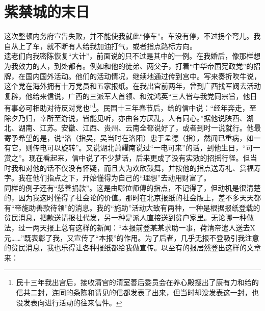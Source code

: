 \fancyhead[RO]{} %
\fancyhead[LE]{} %
\chapter*{紫禁城的末日}
\thispagestyle{empty}
这次整顿内务府宣告失败，并不能使我就此“停车”。车没有停，不过拐个弯儿。我自从上了车，就不断有人给我加油打气，或者指点路标方向。\\

遗老们向我密陈恢复“大计”，前面说的只不过是其中的一例。在我婚后，像那样想为我效力的人，到处都有。例如和他的徒弟、两父子，打着“中华帝国宪政党”的招牌，在国内国外活动。他们的活动情况，继续地通过传到宫中。写来奏折吹牛说，这个党在海外拥有十万党员和五家报纸。在我出宫前两年，曾到广西找军阀去活动复辟，他给来信说，广西的三派军人首领、和沈鸿英“三人皆与我党同宗旨，他日有事必可相助对待反对党也”\footnote{民十三年我出宫后，接收清宫的清室善后委员会在养心殿搜出了康有力和给的信共二封，连同的条陈和请见的信都发表了出来，但当时却没发表这一封，也没发表向进行活动的往来信件。}。民国十三年春节后，给的信中说：“经年奔走，至除夕乃归，幸所至游说，皆能见听，亦由各方厌乱，人有同心。”据他说陕西、湖北、湖南、江苏。安徽、江西、贵州、云南全都说好了，或者到时一说就行。他最寄予希望的是，说“洛（指吴，吴当时在洛阳）忠于孟德（指），然闻已重病，如一有它，则传电可以旋转”。又说湖北萧耀南说过“一电可来”的话，到他生日，“可一赏之”。现在看起来，信中说了不少梦话，后来更成了没有实效的招摇行径。但当时我和对他的话不仅没有怀疑，而且大为欢欣鼓舞，并按他的指点送寿礼、赏福寿字。我在他们指点之下，开始懂得为自己的“理想”去动用财富了。\\

同样的例子还有“慈善捐款”。这是由哪位师傅的指点，不记得了，但动机是很清楚的，因为我这时懂得了社会论的价值。那时在北京报纸的社会版上，差不多天天都有“帝施助善款待领”的消息。我的“施助”活动大致有两种，一种是根据报纸登载的贫民消息，把款送请报社代发，另一种是派人直接送到贫户家里。无论哪一种做法，过一两天报上总有这样的新闻：“本报前登某某求助一事，荷清帝遣人送去X元……”既表彰了我，又宣传了“本报”的作用。为了后者，几乎无报不登吸引我注意的贫民消息，我也乐得让各种报纸都给我做宣传。以至有的报居然登出这样的文章来：\\

